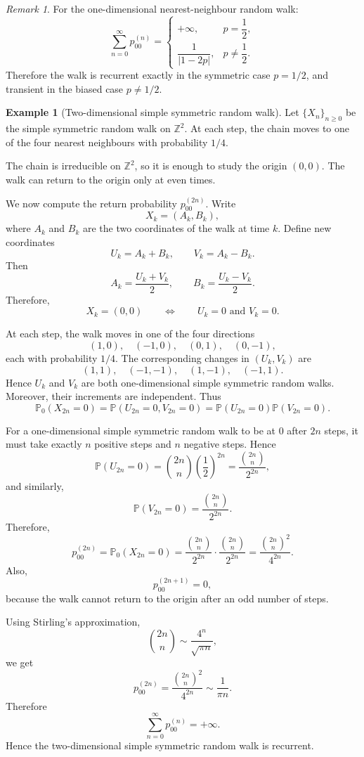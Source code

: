 \documentclass[11pt]{article}
\theoremstyle{plain}
\theoremstyle{definition}
\newtheorem{example}[theorem]{Example}
\theoremstyle{remark}
\newtheorem{remark}[theorem]{Remark}
\begin{document}
\begin{remark}
	For the one-dimensional nearest-neighbour random walk:
	\[
	\sum_{n=0}^{\infty}p_{00}^{(n)}
	=
	\begin{cases}
		+\infty, & p=\dfrac12,\\[8pt]
		\dfrac{1}{|1-2p|}, & p\neq\dfrac12.
	\end{cases}
	\]
	Therefore the walk is recurrent exactly in the symmetric case \(p=1/2\), and transient in the biased case \(p\neq 1/2\).
\end{remark}





\begin{example}[Two-dimensional simple symmetric random walk]
	Let \(\{X_n\}_{n\ge 0}\) be the simple symmetric random walk on \(\mathbb{Z}^2\). At each step, the chain moves to one of the four nearest neighbours with probability \(1/4\).
	
	The chain is irreducible on \(\mathbb{Z}^2\), so it is enough to study the origin \((0,0)\). The walk can return to the origin only at even times.
	
	We now compute the return probability \(p_{00}^{(2n)}\). Write
	\[
	X_k=(A_k,B_k),
	\]
	where \(A_k\) and \(B_k\) are the two coordinates of the walk at time \(k\). Define new coordinates
	\[
	U_k=A_k+B_k,
	\qquad
	V_k=A_k-B_k.
	\]
	Then
	\[
	A_k=\frac{U_k+V_k}{2},
	\qquad
	B_k=\frac{U_k-V_k}{2}.
	\]
	Therefore,
	\[
	X_k=(0,0)
	\qquad\Longleftrightarrow\qquad
	U_k=0 \text{ and } V_k=0.
	\]
	
	At each step, the walk moves in one of the four directions
	\[
	(1,0),\quad (-1,0),\quad (0,1),\quad (0,-1),
	\]
	each with probability \(1/4\). The corresponding changes in \((U_k,V_k)\) are
	\[
	(1,1),\quad (-1,-1),\quad (1,-1),\quad (-1,1).
	\]
	Hence \(U_k\) and \(V_k\) are both one-dimensional simple symmetric random walks. Moreover, their increments are independent. Thus
	\[
	\mathbb{P}_0(X_{2n}=0)
	=
	\mathbb{P}(U_{2n}=0,V_{2n}=0)
	=
	\mathbb{P}(U_{2n}=0)\mathbb{P}(V_{2n}=0).
	\]
	
	For a one-dimensional simple symmetric random walk to be at \(0\) after \(2n\) steps, it must take exactly \(n\) positive steps and \(n\) negative steps. Hence
	\[
	\mathbb{P}(U_{2n}=0)
	=
	\binom{2n}{n}\left(\frac12\right)^{2n}
	=
	\frac{\binom{2n}{n}}{2^{2n}},
	\]
	and similarly,
	\[
	\mathbb{P}(V_{2n}=0)
	=
	\frac{\binom{2n}{n}}{2^{2n}}.
	\]
	Therefore,
	\[
	p_{00}^{(2n)}
	=
	\mathbb{P}_0(X_{2n}=0)
	=
	\frac{\binom{2n}{n}}{2^{2n}}
	\cdot
	\frac{\binom{2n}{n}}{2^{2n}}
	=
	\frac{\binom{2n}{n}^2}{4^{2n}}.
	\]
	Also,
	\[
	p_{00}^{(2n+1)}=0,
	\]
	because the walk cannot return to the origin after an odd number of steps.
	
	Using Stirling's approximation,
	\[
	\binom{2n}{n}
	\sim
	\frac{4^n}{\sqrt{\pi n}},
	\]
	we get
	\[
	p_{00}^{(2n)}
	=
	\frac{\binom{2n}{n}^2}{4^{2n}}
	\sim
	\frac{1}{\pi n}.
	\]
	Therefore
	\[
	\sum_{n=0}^{\infty}p_{00}^{(n)}=+\infty.
	\]
	Hence the two-dimensional simple symmetric random walk is recurrent.
\end{example}
\end{document}
